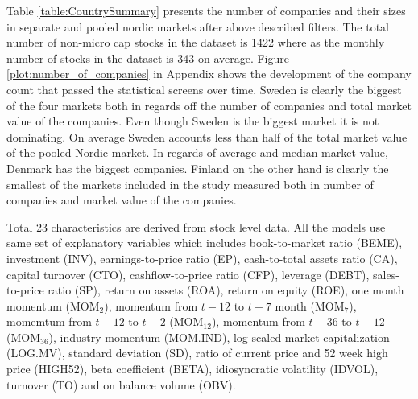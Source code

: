 \documentclass{article}
\begin{document}
Table \ref{table:CountrySummary} presents the number of companies and their sizes in separate and pooled nordic markets after above described filters. The total number of non-micro cap stocks in the dataset is 1422 where as the monthly number of stocks in the dataset is 343 on average. Figure \ref{plot:number_of_companies} in Appendix shows the development of the company count that passed the statistical screens over time. Sweden is clearly the biggest of the four markets both in regards off the number of companies and total market value of the companies. Even though Sweden is the biggest market it is not dominating. On average Sweden accounts less than half of the total market value of the pooled Nordic market. In regards of average  and median market value, Denmark has the biggest companies. Finland on the other hand is clearly the smallest of the markets included in the study measured both in number of companies and market value of the companies. 

Total 23 characteristics are derived from stock level data. All the models use same set of explanatory variables which includes book-to-market ratio (BEME), investment (INV), earnings-to-price ratio (EP), cash-to-total assets ratio (CA), capital turnover (CTO), cashflow-to-price ratio (CFP), leverage (DEBT), sales-to-price ratio (SP), return on assets (ROA), return on equity (ROE), one month momentum (MOM$_2$), momentum from $t-12$ to $t-7$ month (MOM$_7$), momemtum from $t-12$ to $t-2$ (MOM$_{12}$), momentum from $t-36$ to $t-12$ (MOM$_{36}$), industry momentum (MOM.IND), log scaled market capitalization (LOG.MV), standard deviation (SD), ratio of current price and 52 week high price (HIGH52), beta coefficient (BETA), idiosyncratic volatility (IDVOL), turnover (TO) and on balance volume (OBV). 
\end{document}
